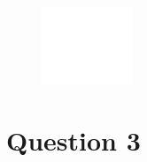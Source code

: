 \documentclass[12pt]{article}
\begin{document}
\begin{enumerate}[a.]
\begin{figure}[h]
        \includegraphics[width=0.24\textwidth]{images/worksheet_19_q2b8_placeholder.png}\hfill
    \end{figure}
\end{enumerate}

\section*{Question 3}
\end{document}

